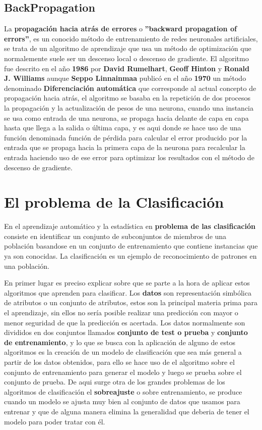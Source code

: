 \documentclass[a4paper, 11pt]{article} %
\begin{document}
\subsection{BackPropagation}
La \textbf{propagación hacia atrás de errores} o \textbf{''backward propagation of errors''}, es un conocido método de entrenamiento de redes neuronales artificiales, se trata de un algoritmo de aprendizaje que usa un método de optimización que normalemente suele ser un descenso local o descenso de gradiente. El algoritmo fue descrito en el año \textbf{1986} por \textbf{David Rumelhart}, \textbf{Geoff Hinton} y \textbf{Ronald J. Williams} aunque \textbf{Seppo Linnainmaa} publicó en el año \textbf{1970} un método denominado \textbf{Diferenciación automática} que corresponde al actual concepto de propagación hacia atrás, el algoritmo se basaba en la repetición de dos procesos la propagación y la actualización de pesos de una neurona, cuando una instancia se usa como entrada de una neurona, se propaga hacia delante de capa en capa hasta que llega a la salida o última capa, y es aqui donde se hace uso de una función denominada función de pérdida para calcular el error producido por la entrada que se propaga hacia la primera capa de la neurona para recalcular la entrada haciendo uso de ese error para optimizar los resultados con el método de descenso de gradiente. 

\section{El problema de la Clasificación}
En el aprendizaje automático y la estadística en \textbf{problema de las clasificación} consiste en identificar un conjunto de subconjuntos de miembros de una población basandose en un conjunto de entrenamiento que contiene instancias que ya son conocidas. La clasificación es un ejemplo de reconocimiento de patrones en una población.

En primer lugar es preciso explicar sobre que se parte a la hora de aplicar estos algoritmos que aprenden para clasificar. Los \textbf{datos} son representación simbólica de atributos o un conjunto de atributos, estos son la principal materia prima para el aprendizaje, sin ellos no sería posible realizar una predicción con mayor o menor seguridad de que la predicción es acertada. Los datos normalmente son divididos en dos conjuntos llamados \textbf{conjunto de test o prueba} y \textbf{conjunto de entrenamiento}, y lo que se busca con la aplicación de alguno de estos algoritmos es la creación de un modelo de clasificación que sea más general a partir de los datos obtenidos, para ello se hace uso de el algoritmo sobre el conjunto de entrenamiento para generar el modelo y luego se prueba sobre el conjunto de prueba. De aqui surge otra de los grandes problemas de los algoritmos de clasificación el \textbf{sobreajuste} o sobre entrenamiento, se produce cuando un modelo se ajusta muy bien al conjunto de datos que usamos para entrenar y que de alguna manera elimina la generalidad que deberia de tener el modelo para poder tratar con él.
\end{document}
